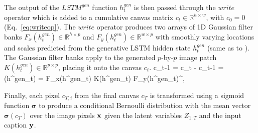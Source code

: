 \documentclass{article} %
\newcommand{\Eqref}[1]{Eq.~\ref{#1}} %
\def\beqa#1\eeqa{\begin{eqnarray}#1\end{eqnarray}}
\newcommand{\FIXME}[1]{\textcolor{red}{[#1]}}
\newcommand{\sigmoid}{\boldsymbol{\sigma}}
\newcommand{\hdec}{h^{gen}}
\newcommand{\writeop}{\mathit{write}}
\newcommand{\decoder}{\mathit{LSTM}^{gen}}
\newcommand{\canv}{c}
\newcommand{\Lat}{Z}
\newcommand{\icaption}{{\bf{y}}}
\newcommand{\oimage}{{\bf{x}}}
\newcommand{\gFilterx}{F_x}
\newcommand{\gFiltery}{F_y}
\newcommand{\WriteFunc}{K}
\newcommand{\real}{\mathbb{R}}
\begin{document}
The output of the $\decoder$ function $\hdec_t$ is then passed through the $\writeop$ operator 
which is added to a cumulative canvas matrix $c_t \in \real^{h \times w}$, with $c_0=0$ (\Eqref{eq:writeop}). 
The $\writeop$ operator produces two arrays of 1D Gaussian filter banks $\gFilterx(\hdec_t)\in\real^{h\times p}$ and $\gFiltery(\hdec_t)\in\real^{w\times p}$ with smoothly varying locations and scales predicted from the generative LSTM hidden state $\hdec_t$ (same as to \citep{gregor_draw}). The Gaussian filter banks apply to the generated $p$-by-$p$ image patch $\WriteFunc(\hdec_t) \in \real^{p\times p}$, placing it onto the canvas $c_t$. 
\beqa
\label{eq:write}
\Delta \canv_{t-1} = \canv_{t} - \canv_{t-1} = \writeop(\hdec_t) = \gFilterx(\hdec_t) \WriteFunc(\hdec_t) \gFiltery(\hdec_t)^\top, 
\eeqa

Finally, each pixel $\canv_{T,i}$ from the final canvas $\canv_T$ is transformed using a sigmoid function $\sigmoid$ to produce a conditional Bernoulli 
distribution with the mean vector $\sigmoid(\canv_{T})$ over the image pixels 
$\oimage$ given the latent variables $\Lat_{1:T}$ and the input caption $\icaption$.
\end{document}
